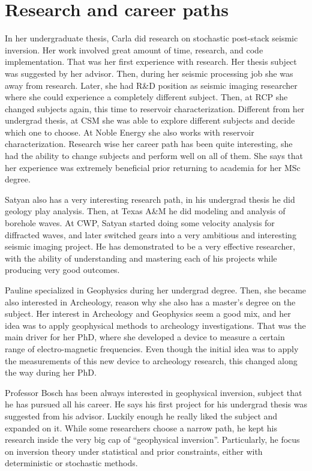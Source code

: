 \documentclass[11pt]{article}
\begin{document}
\section{Research and career paths}
In her undergraduate thesis, Carla did research on stochastic post-stack seismic inversion. Her work involved great 
amount of time, research, and code implementation. That was her first experience with research. 
Her thesis subject was suggested by her advisor. 
 Then, during her seismic processing job she was away from research. Later, she had R\&D position as
seismic imaging researcher where she could experience a completely different subject. Then, at RCP she changed
subjects again, this time to reservoir characterization. Different from her undergrad thesis, at CSM she was
able to explore different subjects and decide which one to choose. At Noble Energy she also works with reservoir 
characterization. Research wise her career path has been quite interesting, she had the ability to change 
subjects and perform well on all of them. She says that her experience was extremely beneficial prior 
returning to academia for her MSc degree.

Satyan also has a very interesting research path, in his undergrad thesis he did geology play analysis. Then,
at Texas A\&M he did modeling and analysis of borehole waves. At CWP, Satyan started doing some velocity analysis
for diffracted waves, and later switched gears into a very ambitious and interesting seismic imaging project. 
 He has demonstrated to be a very effective researcher, with the ability of understanding and mastering 
each of his projects while producing very good outcomes. 


Pauline specialized in Geophysics during her undergrad degree. Then, she became also interested in Archeology, 
reason why she also has a master's degree on the subject. Her interest in Archeology and Geophysics
seem a good mix, and her idea was to apply geophysical methods to archeology investigations. That was
the main driver for her PhD, where she developed a device to measure a certain range of electro-magnetic 
frequencies. Even though the initial idea was to apply the measurements of this new device to archeology 
research, this changed along the way during her PhD. 

Professor Bosch has been always interested in geophysical inversion, subject that he has pursued all his 
career. He says his first project for his undergrad thesis was suggested from his advisor. Luckily enough
he really liked the subject and expanded on it.
 While some researchers choose a narrow path, he kept his research inside the very big cap 
of ``geophysical inversion''. Particularly, he focus on inversion theory under statistical and 
prior constraints, either with deterministic or stochastic methods. 
\end{document}
